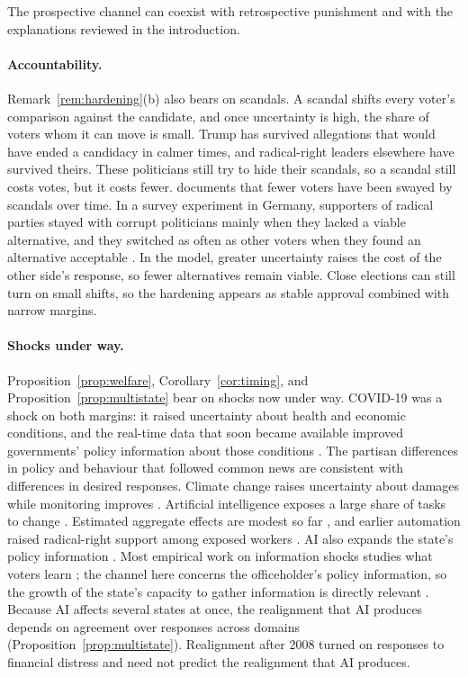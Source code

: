 \documentclass[12pt,letterpaper]{article}
\begin{document}
The prospective channel can coexist with retrospective punishment and with the explanations reviewed in the introduction.

\paragraph{Accountability.}
Remark~\ref{rem:hardening}(b) also bears on scandals. A scandal shifts every voter's comparison against the candidate, and once uncertainty is high, the share of voters whom it can move is small. Trump has survived allegations that would have ended a candidacy in calmer times, and radical-right leaders elsewhere have survived theirs. These politicians still try to hide their scandals, so a scandal still costs votes, but it costs fewer. \citet{Rottinghaus2025} documents that fewer voters have been swayed by scandals over time. In a survey experiment in Germany, supporters of radical parties stayed with corrupt politicians mainly when they lacked a viable alternative, and they switched as often as other voters when they found an alternative acceptable \citep{JankowskiJuenLewandowsky2022}. In the model, greater uncertainty raises the cost of the other side's response, so fewer alternatives remain viable. Close elections can still turn on small shifts, so the hardening appears as stable approval combined with narrow margins.

\paragraph{Shocks under way.}
Proposition~\ref{prop:welfare}, Corollary~\ref{cor:timing}, and Proposition~\ref{prop:multistate} bear on shocks now under way. COVID-19 was a shock on both margins: it raised uncertainty about health and economic conditions, and the real-time data that soon became available improved governments' policy information about those conditions \citep{Chetty2024}. The partisan differences in policy and behaviour that followed common news \citep{Allcott2020,Adolph2022} are consistent with differences in desired responses. Climate change raises uncertainty about damages while monitoring improves \citep{IPCC2023}. Artificial intelligence exposes a large share of tasks to change \citep{Eloundou2024}. Estimated aggregate effects are modest so far \citep{Acemoglu2025}, and earlier automation raised radical-right support among exposed workers \citep{Frey2018,Anelli2021}. AI also expands the state's policy information \citep{Engstrom2020}. Most empirical work on information shocks studies what voters learn \citep{Prior2007,Falck2014,Campante2018,Guriev2021,Zhuravskaya2020}; the channel here concerns the officeholder's policy information, so the growth of the state's capacity to gather information is directly relevant \citep{Brambor2020}. Because AI affects several states at once, the realignment that AI produces depends on agreement over responses across domains (Proposition~\ref{prop:multistate}). Realignment after 2008 turned on responses to financial distress and need not predict the realignment that AI produces.
\end{document}
